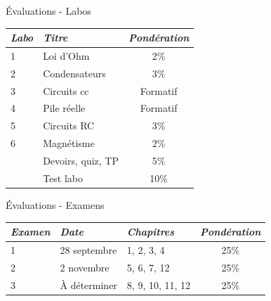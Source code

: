\documentclass[12pt]{beamer}
\begin{document}
\begin{frame}{Évaluations - Labos}
\begin{center}
\begin{tabular}{llc}
\toprule
\textit{Labo}  &  \textit{Titre}    &  \textit{Pondération}  \\
\midrule
1              & Loi d'Ohm          & 2\%                    \\
2              & Condensateurs      & 3\%                    \\
3              & Circuits cc        & Formatif               \\
4              & Pile réelle        & Formatif               \\
5              & Circuits RC        & 3\%                    \\
6              & Magnétisme         & 2\%                    \\
               & Devoirs, quiz, TP  & 5\%                    \\
               & Test labo          & 10\%                   \\
\bottomrule
\end{tabular}
\end{center}

\end{frame}



\begin{frame}{Évaluations - Examens}
\begin{center}
\begin{tabular}{lllc}
\toprule
\textit{Examen}  &  \textit{Date}    &  \textit{Chapitres}  &  \textit{Pondération}  \\
\midrule
1                &  28 septembre     & 1, 2, 3, 4           &  25\%                  \\
2                &  2 novembre       & 5, 6, 7, 12          &  25\%                  \\
3                &  À déterminer     & 8, 9, 10, 11, 12     &  25\%                  \\
\bottomrule
\end{tabular}
\end{center}

\end{frame}
\end{document}

